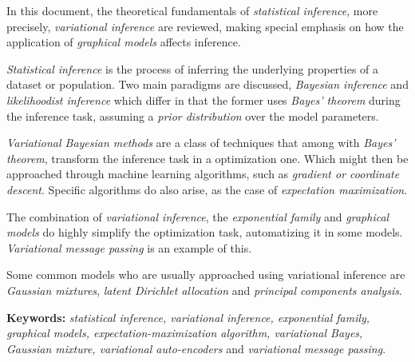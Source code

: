 In this document, the theoretical fundamentals of \emph{statistical inference}, more precisely, \emph{variational inference} are reviewed, making special emphasis on how the application of \emph{graphical models} affects inference.

\emph{Statistical inference} is the process of inferring the underlying properties of a dataset or population. Two main paradigms are discussed, \emph{Bayesian inference} and \emph{likelihoodist inference} which differ in that the former uses \emph{Bayes' theorem} during the inference task, assuming a \emph{prior distribution} over the model parameters.

\emph{Variational Bayesian methods} are a class of techniques that among with \emph{Bayes' theorem}, transform the inference task in a optimization one. Which might then be approached through machine learning algorithms, such as \emph{gradient or coordinate descent}. Specific algorithms do also arise, as the case of \emph{expectation maximization}.

The combination of \emph{variational inference}, the \emph{exponential family} and \emph{graphical models} do highly simplify the optimization task, automatizing it in some models. \emph{Variational message passing} is an example of this.

Some common models who are usually approached using variational inference are \emph{Gaussian mixtures}, \emph{latent Dirichlet allocation} and \emph{principal components analysis}.


\textbf{Keywords:} \emph{statistical inference, variational inference, exponential family, graphical models, expectation-maximization algorithm, variational Bayes, Gaussian mixture, variational auto-encoders} and \emph{variational message passing}.
